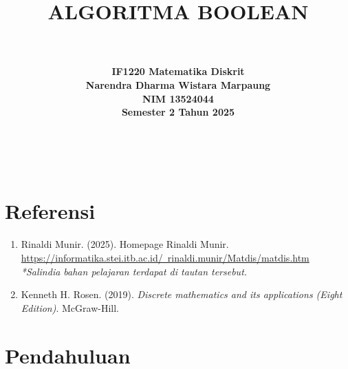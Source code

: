 \documentclass[11pt]{article}
\title {
    \Huge{\bfseries{ALGORITMA BOOLEAN}} \\
}
\author {
    \rule{12.5cm}{0.5pt} \\[3pt]
    \bfseries{IF1220 Matematika Diskrit}\\[3pt]
    Narendra Dharma Wistara Marpaung \\[3pt]
    NIM 13524044 \\[3pt]
    Semester 2 Tahun 2025 \\[3pt]
    \rule{12.5cm}{0.5pt} \\[1.5pt]
}
\date{}
\theoremstyle{definitionstyle}
\theoremstyle{theoremstyle}
\theoremstyle{examplestyle}
\begin{document}
\maketitle
\thispagestyle{empty}
\tableofcontents
\pagebreak
\section*{Referensi}
\begin{enumerate}[left=0pt, itemsep=1.5pt, topsep=1.5pt]
    \item Rinaldi Munir. (2025). Homepage Rinaldi Munir. \href{https://informatika.stei.itb.ac.id/~rinaldi.munir/Matdis/matdis.htm}{https://informatika.stei.itb.ac.id/~rinaldi.munir/Matdis/matdis.htm} \\
    \textit{*Salindia bahan pelajaran terdapat di tautan tersebut.}
    \item Kenneth H. Rosen. (2019). \textit{Discrete mathematics and its applications (Eight Edition)}. McGraw-Hill.
\end{enumerate}

\pagebreak

\setcounter{page}{1}
\section{Pendahuluan}
\end{document}
